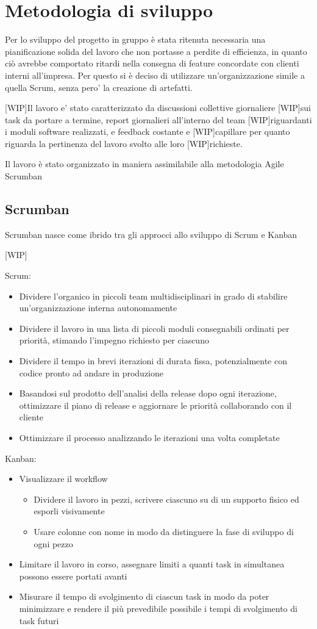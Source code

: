 \chapter{Metodologia di sviluppo}
Per lo sviluppo del progetto in gruppo è stata ritenuta necessaria una pianificazione solida del lavoro che non portasse a perdite di efficienza, in quanto ciò avrebbe comportato ritardi nella consegna di feature concordate con clienti interni all'impresa.
Per questo si è deciso di utilizzare un'organizzazione simile a quella Scrum, senza pero' la creazione di artefatti.

[WIP]Il lavoro e' stato caratterizzato da discussioni collettive giornaliere [WIP]sui task da portare a termine, report giornalieri all'interno del team [WIP]riguardanti i moduli software realizzati, e feedback costante e [WIP]capillare per quanto riguarda la pertinenza del lavoro svolto alle loro [WIP]richieste.

Il lavoro è stato organizzato in maniera assimilabile alla metodologia Agile Scrumban
\section{Scrumban}
Scrumban nasce come ibrido tra gli approcci allo sviluppo di Scrum e Kanban

[WIP]
\begin{multicols}{2}
Scrum:
\begin{itemize}
\item
Dividere l'organico in piccoli team multidisciplinari in grado di stabilire un'organizzazione interna autonomamente
\item
Dividere il lavoro in una lista di piccoli moduli consegnabili ordinati per priorità, stimando l'impegno richiesto per ciascuno
\item
Dividere il tempo in brevi iterazioni di durata fissa, potenzialmente con codice pronto ad andare in produzione
\item
Basandosi sul prodotto dell'analisi della release dopo ogni iterazione, ottimizzare il piano di release e aggiornare le priorità collaborando con il cliente
\item
Ottimizzare il processo analizzando le iterazioni una volta completate
\end{itemize}
\columnbreak
Kanban:
\begin{itemize}
\item
Visualizzare il workflow
\begin{itemize}
\item
Dividere il lavoro in pezzi, scrivere ciascuno su di un supporto fisico ed esporli visivamente
\item
Usare colonne con nome in modo da distinguere la fase di sviluppo di ogni pezzo
\end{itemize}
\item
Limitare il lavoro in corso, assegnare limiti a quanti task in simultanea possono essere portati avanti
\item
Misurare il tempo di svolgimento di ciascun task in modo da poter minimizzare e rendere il più prevedibile possibile i tempi di svolgimento di task futuri
\end{itemize}
\end{multicols}

